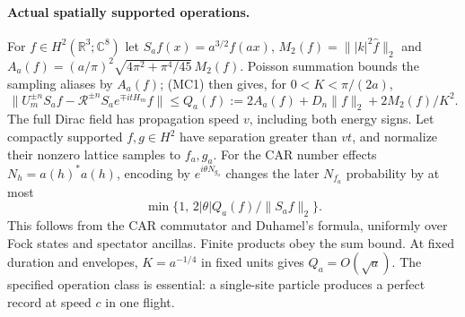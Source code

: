 \paragraph{Actual spatially supported operations.}
For $f\in H^2(\mathbb R^3;\mathbb C^8)$ let
$S_af(x)=a^{3/2}f(ax)$,
$M_2(f)=\||k|^2\widehat f\|_2$ and
$A_a(f)=(a/\pi)^2\sqrt{4\pi^2+\pi^4/45}\,M_2(f)$.
Poisson summation bounds the sampling aliases by $A_a(f)$; (MC1) then gives,
for $0<K<\pi/(2a)$,
\[
 \|U_m^{\pm n}S_af-\mathcal R^{\pm n}S_ae^{\mp itH_m}f\|
 \le Q_a(f):=2A_a(f)+D_n\|f\|_2+2M_2(f)/K^2.
 \tag{MC2}
\]
The full Dirac field has propagation speed $v$, including both energy
signs. Let compactly supported $f,g\in H^2$ have separation greater than $vt$,
and normalize their nonzero lattice samples to $f_a,g_a$.
For the CAR number effects $N_h=a(h)^*a(h)$, encoding by
$e^{i\theta N_{g_a}}$ changes the later $N_{f_a}$ probability by at most
\[
 \min\{1,\,2|\theta|Q_a(f)/\|S_af\|_2\}.
 \tag{MC3}
\]
This follows from the CAR commutator and Duhamel's formula, uniformly over
Fock states and spectator ancillas. Finite products obey the sum bound.
At fixed duration and envelopes, $K=a^{-1/4}$ in fixed units gives
$Q_a=O(\sqrt a)$. The specified operation class is essential: a single-site
particle produces a perfect record at speed $c$ in one flight.

